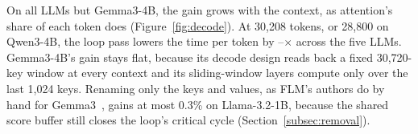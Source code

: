 On all LLMs but Gemma3-4B, the gain grows with the context, as attention's share of each token does (Figure~\ref{fig:decode}).
At 30{,}208 tokens, or 28{,}800 on Qwen3-4B, the loop pass lowers the time per token by \DecodeGainLo--\DecodeGainHi$\times$ across the five LLMs.
Gemma3-4B's gain stays flat, because its decode design reads back a fixed 30{,}720-key window at every context and its sliding-window layers compute only over the last 1{,}024 keys.
Renaming only the keys and values, as FLM's authors do by hand for Gemma3~\citep{du2026gemma3}, gains at most 0.3\% on Llama-3.2-1B, because the shared score buffer still closes the loop's critical cycle (Section~\ref{subsec:removal}).

